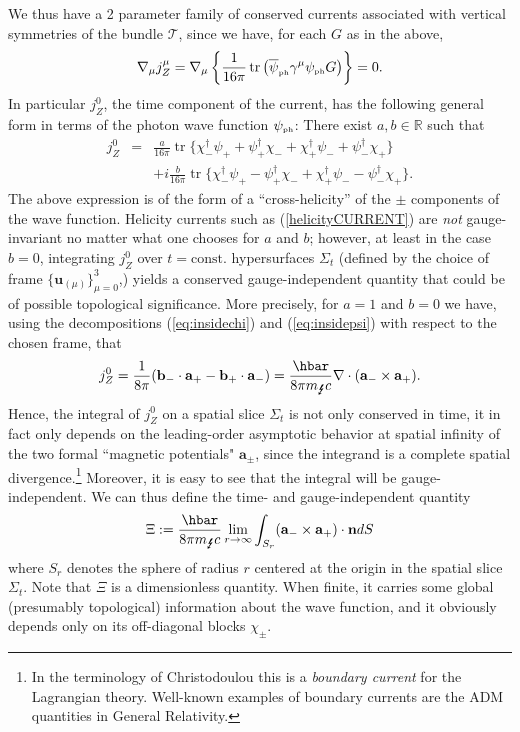 \documentclass[12pt]{article}
\theoremstyle{definition}
\DeclareMathOperator{\tr}{tr}
\newcommand{\refeq}[1]{(\ref{#1})}
\numberwithin{equation}{section}
\newcommand{\bb}{\mathbf{b}}
\newcommand{\ba}{\mathbf{a}}
\newcommand{\bn}{\mathbf{n}}
\newcommand{\bu}{\mathbf{u}}
\newcommand{\beq}{\begin{equation}}
\newcommand{\eeq}{\end{equation}}
\newcommand{\cT}{\mathcal{T}}
\newcommand{\psiPH}{{\psi_{\mbox{\rm\tiny ph}}}}
\newcommand{\psiPHb}{{\overline\psi_{\mbox{\rm\tiny ph}}}}
\newcommand{\mPH}{{m_{\mbox{\Lightning}}}}
\newcommand{\Rset}{{\mathbb R}}
\newcommand{\ga}{\gamma}
\newcommand{\Si}{\Sigma}
\newcommand{\nab}{\nabla}
\newcommand{\bna}{\begin{eqnarray}}
\newcommand{\ena}{\end{eqnarray}}
\begin{document}
We thus have a 2 parameter family of conserved currents associated with vertical symmetries of the bundle $\cT$, since we have, for
 each $G$ as in the above,
\beq 
\nab_\mu j_Z^\mu = \nab_\mu \left\{ \frac{1}{16 \pi}\tr\left( \psiPHb \ga^\mu \psiPH G \right) \right\} = 0.
\eeq
 In particular $j_Z^0$, the time component of the current, has the following general form in terms of the photon wave function $\psiPH$:
 There exist  $a,b\in \Rset$ such that 
\bna\label{nongaugeconslaw}
j_Z^0 & = &  \frac{a}{16 \pi} \tr \{ \chi_-^\dag \psi_+ +\psi_+^\dag \chi_- + \chi_+^\dag \psi_- + \psi_-^\dag \chi_+ \} \\
& &+  i\frac{b}{16 \pi} \tr \{ \chi_-^\dag \psi_+ - \psi_+^\dag \chi_- + \chi_+^\dag \psi_- -\psi_-^\dag\chi_+\}.
\ena
 The above expression is of the form of a ``cross-helicity'' of the $\pm$ components of the wave function.
 Helicity currents such as \refeq{helicityCURRENT} are {\em not} gauge-invariant no matter what one chooses for $a$ and $b$;
however, at least in the case $b=0$, integrating $j_Z^0$ over $t=  \mbox{const.}$ hypersurfaces $\Si_t$ (defined by the choice 
of frame $\{\bu_{(\mu)}\}_{\mu = 0}^3$,)  yields a conserved gauge-independent quantity that could be of possible topological significance. 
More precisely, for $a=1$ and $b=0$ we have, using the decompositions \refeq{eq:insidechi} and \refeq{eq:insidepsi} with respect to the chosen 
frame, that
\beq
j_Z^0  =  \frac{1}{8 \pi} (\bb_- \cdot \ba_+ - \bb_+ \cdot \ba_-) = \frac{\hbar}{8 \pi \mPH c}\nab\cdot (\ba_- \times \ba_+).
\eeq
Hence, the integral of $j_Z^0$ on a spatial slice $\Si_t$ is not only conserved in time, it in fact only depends on the leading-order 
asymptotic behavior at spatial infinity of the two formal ``magnetic potentials" $\ba_\pm$, since the integrand is a complete spatial 
divergence.\footnote{In the terminology of Christodoulou \cite{Chr2000} this is a {\em boundary current} for the Lagrangian theory. 
 Well-known examples of boundary currents are the ADM quantities in General Relativity.} 
 Moreover, it is easy to see that the integral will be gauge-independent. 
We can thus define the time- and gauge-independent quantity
\beq
\Xi := \frac{\hbar}{8 \pi \mPH c}\lim_{r\to \infty} \int_{S_r} (\ba_- \times\ba_+)\cdot \bn dS
\eeq
where $S_r$ denotes the sphere of radius $r$ centered at the origin in the spatial slice $\Si_t$. 
 Note that $\Xi$ is a dimensionless quantity.
 When finite, it carries some global (presumably topological)
information about the wave function, and it obviously depends only on its off-diagonal blocks $\chi_\pm$. 
\end{document}

